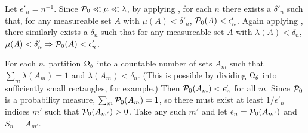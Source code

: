 \begin{lem}
%
Let $\epsilon'_n = n^{-1}$.  Since $\mathcal{P}_{0} \ll \mu \ll \lambda$, by applying
\citet[Proposition 15.5]{nielsen:1997:measure}, for each $n$ there exists a
$\delta'_n$ such that, for any measureable set $A$ with $\mu(A) <
\delta'_n$, $\mathcal{P}_{0}(A) < \epsilon'_n$.  Again applying
\citet[Proposition 15.5]{nielsen:1997:measure}, there similarly exists
a $\delta_n$ such that for any measureable set $A$ with $\lambda(A) <
\delta_n$, $\mu(A) < \delta'_n \Rightarrow \mathcal{P}_{0}(A) < \epsilon'_n$.

For each $n$, partition $\Omega_{\theta}$ into a countable number of sets $A_{m}$ such
that $\sum_{m} \lambda(A_{m}) = 1$ and $\lambda(A_{m}) < \delta_n$. (This is
possible by dividing $\Omega_{\theta}$ into sufficiently small rectangles, for
example.)  Then $\mathcal{P}_{0}(A_{m}) < \epsilon'_n$ for all $m$.  Since $\mathcal{P}_{0}$ is a
probability measure, $\sum_m \mathcal{P}_{0}(A_{m}) = 1$, so there must exist at least $1 /
\epsilon'_n$ indices $m'$ such that $\mathcal{P}_{0}(A_{m'}) > 0$. Take any such $m'$ and
let $\epsilon_n = \mathcal{P}_{0}(A_{m'})$ and $S_n = A_{m'}$.

%
\end{lem}
